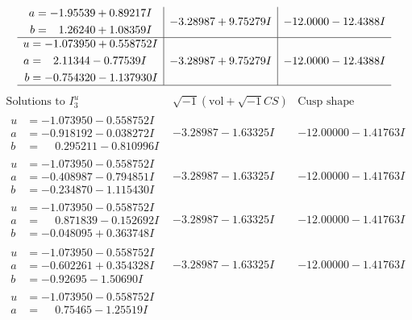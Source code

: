 \documentclass[1p]{elsarticle_modified}
\theoremstyle{definition}
\newcommand{\I}{\sqrt{-1}}
\begin{document}
$$\begin{array}{c|c|c}
\begin{aligned}
a &= -1.95539 + 0.89217 I \\
b &= \phantom{-}1.26240 + 1.08359 I\end{aligned}
 & -3.28987 + 9.75279 I & -12.0000 - 12.4388 I \\ \hline\begin{aligned}
u &= -1.073950 + 0.558752 I \\
a &= \phantom{-}2.11344 - 0.77539 I \\
b &= -0.754320 - 1.137930 I\end{aligned}
 & -3.28987 + 9.75279 I & -12.0000 - 12.4388 I\\
 \hline 
 \end{array}$$\newpage$$\begin{array}{c|c|c}  
\text{Solutions to }I^u_{3}& \I (\text{vol} + \sqrt{-1}CS) & \text{Cusp shape}\\
 \hline 
\begin{aligned}
u &= -1.073950 - 0.558752 I \\
a &= -0.918192 - 0.038272 I \\
b &= \phantom{-}0.295211 - 0.810996 I\end{aligned}
 & -3.28987 - 1.63325 I & -12.00000 - 1.41763 I \\ \hline\begin{aligned}
u &= -1.073950 - 0.558752 I \\
a &= -0.408987 - 0.794851 I \\
b &= -0.234870 - 1.115430 I\end{aligned}
 & -3.28987 - 1.63325 I & -12.00000 - 1.41763 I \\ \hline\begin{aligned}
u &= -1.073950 - 0.558752 I \\
a &= \phantom{-}0.871839 - 0.152692 I \\
b &= -0.048095 + 0.363748 I\end{aligned}
 & -3.28987 - 1.63325 I & -12.00000 - 1.41763 I \\ \hline\begin{aligned}
u &= -1.073950 - 0.558752 I \\
a &= -0.602261 + 0.354328 I \\
b &= -0.92695 - 1.50690 I\end{aligned}
 & -3.28987 - 1.63325 I & -12.00000 - 1.41763 I \\ \hline\begin{aligned}
u &= -1.073950 - 0.558752 I \\
a &= \phantom{-}0.75465 - 1.25519 I \\

\end{aligned}
\end{array}$$
\end{document}
